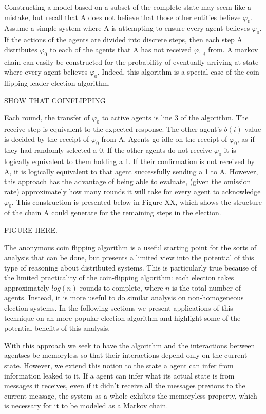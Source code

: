 Constructing a model based on a subset of the complete state may seem like a mistake, but recall that A does not believe that those other entities believe $\varphi_0$. Assume a simple system where A is attempting to ensure every agent believes $\varphi_0$. If the actions of the agents are divided into discrete steps, then each step A distributes $\varphi_0$ to each of the agents that A has not received $\varphi_{1,i}$ from. A markov chain can easily be constructed for the probability of eventually arriving at state where every agent believes $\varphi_0$. Indeed, this algorithm is a special case of the coin flipping leader election algorithm.

SHOW THAT COINFLIPPING 

Each round, the transfer of $\varphi_0$ to active agents is line 3 of the algorithm. The receive step is equivalent to the expected response. The other agent's $b(i)$ value is decided by the receipt of $\varphi_0$ from A. Agents go idle on the receipt of $\varphi_0$, as if they had randomly selected a 0. If the other agents do not receive $\varphi_0$ it is logically equivalent to them holding a 1. If their confirmation is not received by A, it is logically equivalent to that agent successfully sending a 1 to A. However, this approach has the advantage of being able to evaluate, (given the omission rate) approximately how many rounds it will take for every agent to acknowledge $\varphi_0$. This construction is presented below in Figure XX, which shows the structure of the chain A could generate for the remaining steps in the election.

FIGURE HERE.

The anonymous coin flipping algorithm is a useful starting point for the sorts of analysis that can be done, but presents a limited view into the potential of this type of reasoning about distributed systems. This is particularly true because of the limited practicality of the coin-flipping algorithm: each election takes approximately $log(n)$ rounds to complete, where $n$ is the total number of agents. Instead, it is more useful to do similar analysis on non-homogeneous election systems. In the following sections we present applications of this technique on an more popular election algorithm and highlight some of the potential benefits of this analysis.


With this approach we seek to have the algorithm and the interactions between agentses be memoryless so that their interactions depend only on the current state. However, we extend this notion to the state a agent can infer from information leaked to it. If a agent can infer what its actual state is from messages it receives, even if it didn't receive all the messages previous to the current message, the system as a whole exhibits the memoryless property, which is necessary for it to be modeled as a Markov chain. 

